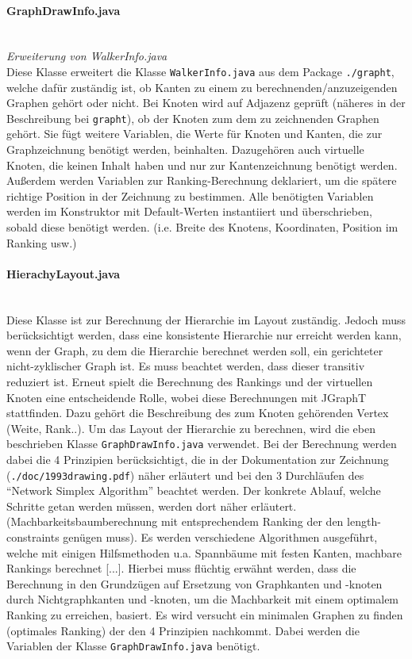 \documentclass[10pt,a4paper]{article}
\begin{document}
\paragraph{GraphDrawInfo.java}\ \\
\emph{Erweiterung von WalkerInfo.java}\\
{\footnotesize Diese Klasse erweitert die Klasse \texttt{WalkerInfo.java} aus dem Package \texttt{./grapht}, welche dafür zuständig ist, ob Kanten zu einem zu berechnenden/anzuzeigenden Graphen gehört oder nicht. Bei Knoten wird auf Adjazenz geprüft (näheres in der Beschreibung bei \texttt{grapht}), ob der Knoten zum dem zu zeichnenden Graphen gehört. Sie fügt weitere Variablen, die Werte für Knoten und Kanten, die zur Graphzeichnung benötigt werden, beinhalten. Dazugehören auch virtuelle Knoten, die keinen Inhalt haben und nur zur Kantenzeichnung benötigt werden. Außerdem werden Variablen zur Ranking-Berechnung deklariert, um die spätere richtige Position in der Zeichnung zu bestimmen. Alle benötigten Variablen werden im Konstruktor mit Default-Werten instantiiert und überschrieben, sobald diese benötigt werden. (i.e. Breite des Knotens, Koordinaten, Position im Ranking usw.)}

\paragraph{HierachyLayout.java}\ \\
{\footnotesize Diese Klasse ist zur Berechnung der Hierarchie im Layout zuständig. Jedoch muss berücksichtigt werden, dass eine konsistente Hierarchie nur erreicht werden kann, wenn der Graph, zu dem die Hierarchie berechnet werden soll, ein gerichteter nicht-zyklischer Graph ist. Es muss beachtet werden, dass dieser transitiv reduziert ist. Erneut spielt die Berechnung des Rankings und der virtuellen Knoten eine entscheidende Rolle, wobei diese Berechnungen mit JGraphT stattfinden. Dazu gehört die Beschreibung des zum Knoten gehörenden Vertex (Weite, Rank..). Um das Layout der Hierarchie zu berechnen, wird die eben beschrieben Klasse \texttt{GraphDrawInfo.java} verwendet. Bei der Berechnung werden dabei die 4 Prinzipien berücksichtigt, die in der Dokumentation zur Zeichnung (\texttt{./doc/1993drawing.pdf}) näher erläutert und bei den 3 Durchläufen des "`Network Simplex Algorithm"' beachtet werden. Der konkrete Ablauf, welche Schritte getan werden müssen, werden dort näher erläutert. (Machbarkeitsbaumberechnung mit entsprechendem Ranking der den length-constraints genügen muss).  Es werden verschiedene Algorithmen ausgeführt, welche mit einigen Hilfsmethoden u.a. Spannbäume mit festen Kanten, machbare Rankings berechnet [...]. Hierbei muss flüchtig erwähnt werden, dass die Berechnung in den Grundzügen auf Ersetzung von Graphkanten und -knoten durch Nichtgraphkanten und -knoten, um die Machbarkeit mit einem optimalem Ranking zu erreichen, basiert. Es wird versucht ein minimalen Graphen zu finden (optimales Ranking) der den 4 Prinzipien nachkommt. Dabei werden die Variablen der Klasse \texttt{GraphDrawInfo.java} benötigt.} 
\end{document}

